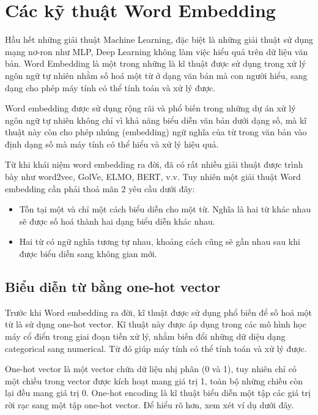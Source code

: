 \section{Các kỹ thuật Word Embedding}
\label{sec:word-embedding-in-details}
Hầu hết những giải thuật Machine Learning, đặc biệt là những giải thuật sử dụng mạng nơ-ron như MLP, Deep Learning không làm việc hiểu quả trên dữ liệu văn bản. Word Embedding là một trong những là kĩ thuật được sử dụng trong xử lý ngôn ngữ tự nhiên nhằm số hoá một từ ở dạng văn bản mà con người hiểu, sang dạng cho phép máy tính có thể tính toán và xử lý được. 

Word embedding được sử dụng rộng rãi và phổ biến trong những dự án xử lý ngôn ngữ tự nhiên không chỉ vì khả năng biểu diễn văn bản dưới dạng số, mà kĩ thuật này còn cho phép nhúng (embedding) ngữ nghĩa của từ trong văn bản vào định dạng số mà máy tính có thể hiểu và xử lý hiệu quả.

Từ khi khái niệm word embedding ra đời, đã có rất nhiều giải thuật được trình bày như word2vec, GolVe, ELMO, BERT, v.v. Tuy nhiên một giải thuật Word embedding cần phải thoả mãn 2 yêu cầu dưới đây:

\begin{itemize}
    \item Tồn tại một và chỉ một cách biểu diễn cho một từ. Nghĩa là hai từ khác nhau sẽ được số hoá thành hai dạng biểu diễn khác nhau.
    
    \item Hai từ có ngữ nghĩa tương tự nhau, khoảng cách cũng sẽ gần nhau sau khi được biểu diễn sang không gian mới.
\end{itemize}


\subsection{Biểu diễn từ bằng one-hot vector}
\label{one-hot-vector-in-details}

Trước khi Word embedding ra đời, kĩ thuật được sử dụng phổ biến để số hoá một từ là sử dụng one-hot vector. Kĩ thuật này được áp dụng trong các mô hình học máy cổ điển trong giai đoạn tiền xử lý, nhằm biến đổi những dữ diệu dạng categorical sang numerical. Từ đó giúp máy tính có thể tính toán và xử lý được.

One-hot vector là một vector chứa dữ liệu nhị phân (0 và 1), tuy nhiên chỉ có một chiều trong vector được kích hoạt mang giá trị 1, toàn bộ những chiều còn lại đều mang giá trị 0. One-hot encoding là kĩ thuật biểu diễn một tập các giá trị rời rạc sang một tập one-hot vector. Để hiểu rõ hơn, xem xét ví dụ dưới đây.

